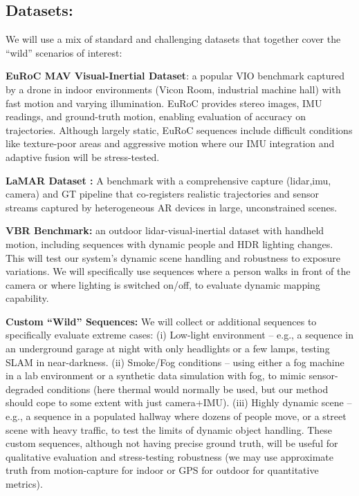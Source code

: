 \subsection{Datasets:} We will use a mix of standard and challenging datasets that together cover the “wild” scenarios of interest:

\textbf{EuRoC MAV Visual-Inertial Dataset\cite{burri2016euroc}}: a popular VIO benchmark captured by a drone in indoor environments (Vicon Room, industrial machine hall) with fast motion and varying illumination. EuRoC provides stereo images, IMU readings, and ground-truth motion, enabling evaluation of accuracy on trajectories. Although largely static, EuRoC sequences include difficult conditions like texture-poor areas and aggressive motion where our IMU integration and adaptive fusion will be stress-tested.

\textbf{LaMAR Dataset \cite{sarlin2022lamar}:} A benchmark with a comprehensive capture (lidar,imu, camera) and GT pipeline that co-registers realistic
trajectories and sensor streams captured by heterogeneous AR devices in large, unconstrained scenes.

\textbf{VBR Benchmark\cite{brizi2024vbr}:} an outdoor lidar-visual-inertial dataset with handheld motion, including sequences with dynamic people and HDR lighting changes. This will test our system’s dynamic scene handling and robustness to exposure variations. We will specifically use sequences where a person walks in front of the camera or where lighting is switched on/off, to evaluate dynamic mapping capability.



\textbf{Custom “Wild” Sequences:} We will collect or additional sequences to specifically evaluate extreme cases: (i) Low-light environment – e.g., a sequence in an underground garage at night with only headlights or a few lamps, testing SLAM in near-darkness. (ii) Smoke/Fog conditions – using either a fog machine in a lab environment or a synthetic data simulation with fog, to mimic sensor-degraded conditions (here thermal would normally be used, but our method should cope to some extent with just camera+IMU). (iii) Highly dynamic scene – e.g., a sequence in a populated hallway where dozens of people move, or a street scene with heavy traffic, to test the limits of dynamic object handling. These custom sequences, although not having precise ground truth, will be useful for qualitative evaluation and stress-testing robustness (we may use approximate truth from motion-capture for indoor or GPS for outdoor for quantitative metrics).



